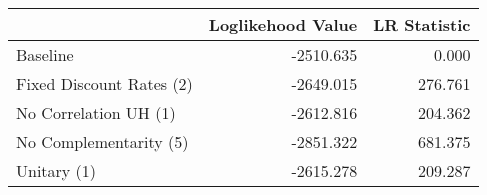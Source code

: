 \begin{tabular}{lrr}
\toprule
{} & Loglikehood Value & LR Statistic \\
\midrule
Baseline                 &         -2510.635 &        0.000 \\
Fixed Discount Rates (2) &         -2649.015 &      276.761 \\
No Correlation UH (1)    &         -2612.816 &      204.362 \\
No Complementarity (5)   &         -2851.322 &      681.375 \\
Unitary (1)              &         -2615.278 &      209.287 \\
\bottomrule
\end{tabular}
